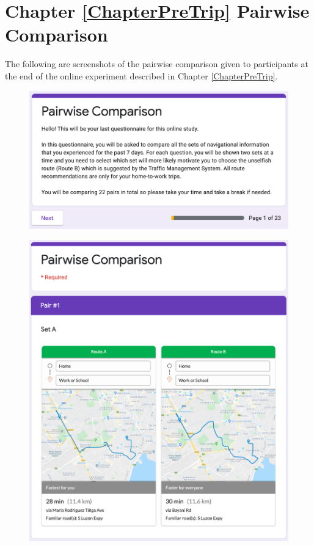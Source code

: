 \chapter{Chapter \ref{ChapterPreTrip} Pairwise Comparison}
\label{AppendixE}

The following are screenshots of the pairwise comparison given to participants at the end of the online experiment described in Chapter \ref{ChapterPreTrip}. 

\begin{figure}[h]
  \centering
  \includegraphics[scale=0.6]{figures/e-pair1.png}
\end{figure}

\begin{figure}[h]
  \centering
  \includegraphics[scale=0.6]{figures/e-pair3.png}
\end{figure}


